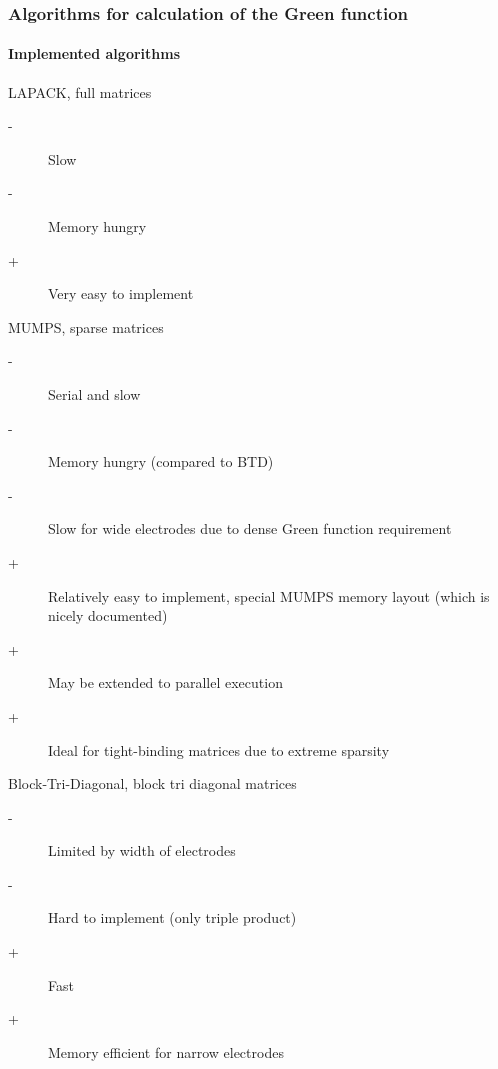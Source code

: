 \begin{frame}
  \frametitle{Algorithms for calculation of the Green function}
  \framesubtitle{Implemented algorithms}

  \footnotesize
  \begin{block}{\small LAPACK, full matrices}

    \begin{description}
      \item[-] Slow
      \item[-] Memory hungry
      \item[+] Very easy to implement
    \end{description}

  \end{block}

  \begin{block}{\small MUMPS, sparse matrices}

    \begin{description}
      \item[-] Serial and slow
      \item[-] Memory hungry (compared to BTD)
      \item[-] Slow for wide electrodes due to dense Green function requirement
      \item[+] Relatively easy to implement, special MUMPS memory layout (which is nicely documented)
      \item[+] May be extended to parallel execution
      \item[+] Ideal for tight-binding matrices due to extreme sparsity
    \end{description}

  \end{block}

  \begin{block}{\small Block-Tri-Diagonal, block tri diagonal matrices}

    \begin{description}
      \item[-] Limited by width of electrodes
      \item[-] Hard to implement (only triple product)
      \item[+] Fast
      \item[+] Memory efficient for narrow electrodes
    \end{description}

  \end{block}

\end{frame}



